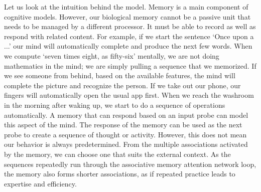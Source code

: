 \documentclass[reprint,amsmath,amssymb,apr,aip,onecolumn, 11pt]{revtex4-1}
\begin{document}
Let us look at the intuition behind the model. Memory is a main component of cognitive models. However, our biological memory cannot be a passive unit that needs to be managed by a different processor. It must be able to record as well as respond with related content. For example, if we start the sentence `Once upon a ...' our mind will automatically complete and produce the next few words. When we compute `seven times eight, as fifty-six' mentally, we are not doing mathematics in the mind; we are simply pulling a sequence that we memorized.  If we see someone from behind, based on the available features, the mind will complete the picture and recognize the person. If we take out our phone, our fingers will automatically open the usual app first. When we reach the washroom in the morning after waking up, we start to do a sequence of operations automatically. A memory that can respond based on an input probe can model this aspect of the mind.  The response of the memory can be used as the next probe to create a sequence of thought or activity. However, this does not mean our behavior is always predetermined. From the multiple associations activated by the memory, we can choose one that suits the external context. As the sequences repeatedly run through the associative memory attention network loop, the memory also forms shorter associations, as if repeated practice leads to expertise and efficiency.
\end{document}
